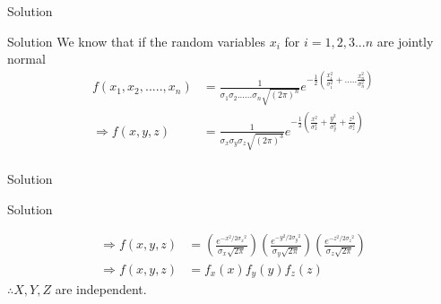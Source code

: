 \documentclass{beamer}
\providecommand{\brak}[1]{\ensuremath{\left(#1\right)}}
\begin{document}
\begin{frame}{Solution}
  \begin{block}{Solution}
      We know that if the random variables $x_i$ for $i = 1,2,3...n$ are jointly normal 
\begin{align}
f(x_1,x_2,.....,x_n) &= \frac{1}{\sigma_1\sigma_2......\sigma_n \sqrt{{(2\pi)}^n}} e^{{-\frac{1}{2} \brak{\frac{x_1^2}{\sigma_1^2} +..... \frac{x_n^2}{\sigma_n^2} } }} \\
\Rightarrow f(x,y,z) &= \frac{1}{\sigma_x\sigma_y\sigma_z \sqrt{{(2\pi)}^3}} e^{-\frac{1}{2} \brak{ \frac{x^2}{\sigma_x^2} + \frac{y^2}{\sigma_y^2} + \frac{z^2}{\sigma_z^2} } } \\ 
\end{align}
  \end{block}

\end{frame}



\begin{frame}{Solution}
\begin{block}{Solution}


\begin{align}
\Rightarrow f(x,y,z) &= \brak{\frac{e^{-x^{2}/2{\sigma_x}^{2}}}{\sigma_x\sqrt{2\pi}}} \brak{\frac{e^{-y^{2}/2{\sigma_y}^{2}}}{\sigma_y\sqrt{2\pi}}} \brak{\frac{e^{-z^{2}/2{\sigma_z}^{2}}}{\sigma_z\sqrt{2\pi}}} \\
\Rightarrow f(x,y,z) &= f_x(x) f_y(y) f_z(z)
\end{align}
 $\therefore X,Y,Z$ are independent.
\end{block}
    
\end{frame}
\end{document}
